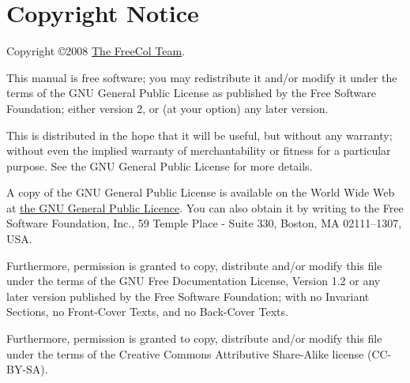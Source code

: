 \documentclass[12pt]{book}
\begin{document}
\hypertarget{Copyright Notice}{\chapter{Copyright Notice}}

Copyright \copyright 2008
\href{http://freecol.sourceforge.net/index.php?section=8}{The FreeCol
Team}.

This manual is free software; you may redistribute it and/or modify it
under the terms of the GNU General Public License as published by the
Free Software Foundation; either version 2, or (at your option) any
later version.

This is distributed in the hope that it will be useful, but without
any warranty; without even the implied warranty of merchantability or
fitness for a particular purpose. See the GNU General Public License
for more details.

A copy of the GNU General Public License is available on the World
Wide Web at \href{http://www.gnu.org/copyleft/gpl.html}{the GNU
General Public Licence}. You can also obtain it by writing to the Free
Software Foundation, Inc., 59 Temple Place - Suite 330, Boston, MA
02111--1307, USA.


Furthermore, permission is granted to copy, distribute and/or modify
this file under the terms of the GNU Free Documentation License,
Version 1.2 or any later version published by the Free Software
Foundation; with no Invariant Sections, no Front-Cover Texts, and no
Back-Cover Texts.

Furthermore, permission is granted to copy, distribute and/or modify
this file under the terms of the Creative Commons Attributive
Share-Alike license (CC-BY-SA).


\printindex
\end{document}
